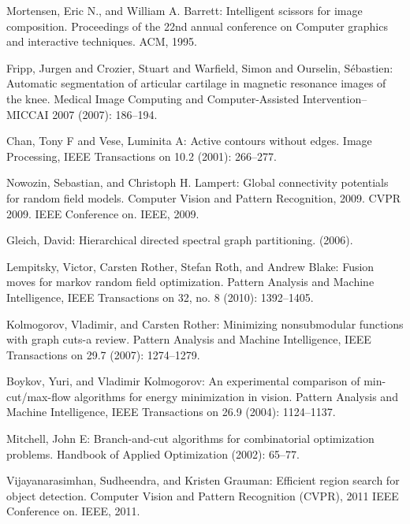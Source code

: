 \documentclass{SMBV13}
\begin{document}
%
\def\refname{Literatur}
\begin{thebibliography}{AA}
                 
 Mortensen, Eric N., and William A. Barrett: Intelligent scissors for image composition. Proceedings of the 22nd annual conference on Computer graphics and interactive techniques. ACM, 1995.

 Fripp, Jurgen and Crozier, Stuart and Warfield, Simon and Ourselin, S{\'e}bastien: Automatic segmentation of articular cartilage in magnetic resonance images of the knee. Medical Image Computing and Computer-Assisted Intervention--MICCAI 2007 (2007): 186--194.

 Chan, Tony F and Vese, Luminita A: Active contours without edges. Image Processing, IEEE Transactions on 10.2 (2001): 266--277.

 Nowozin, Sebastian, and Christoph H. Lampert: Global connectivity potentials for random field models. Computer Vision and Pattern Recognition, 2009. CVPR 2009. IEEE Conference on. IEEE, 2009.

 Gleich, David: Hierarchical directed spectral graph partitioning. (2006).

 Lempitsky, Victor, Carsten Rother, Stefan Roth, and Andrew Blake: Fusion moves for markov random field optimization. Pattern Analysis and Machine Intelligence, IEEE Transactions on 32, no. 8 (2010): 1392--1405.

 Kolmogorov, Vladimir, and Carsten Rother: Minimizing nonsubmodular functions with graph cuts-a review. Pattern Analysis and Machine Intelligence, IEEE Transactions on 29.7 (2007): 1274--1279.

 Boykov, Yuri, and Vladimir Kolmogorov: An experimental comparison of min-cut/max-flow algorithms for energy minimization in vision. Pattern Analysis and Machine Intelligence, IEEE Transactions on 26.9 (2004): 1124--1137.

 Mitchell, John E: Branch-and-cut algorithms for combinatorial optimization problems. Handbook of Applied Optimization (2002): 65--77.

 Vijayanarasimhan, Sudheendra, and Kristen Grauman: Efficient region search for object detection. Computer Vision and Pattern Recognition (CVPR), 2011 IEEE Conference on. IEEE, 2011.


\end{thebibliography}
\end{document}
